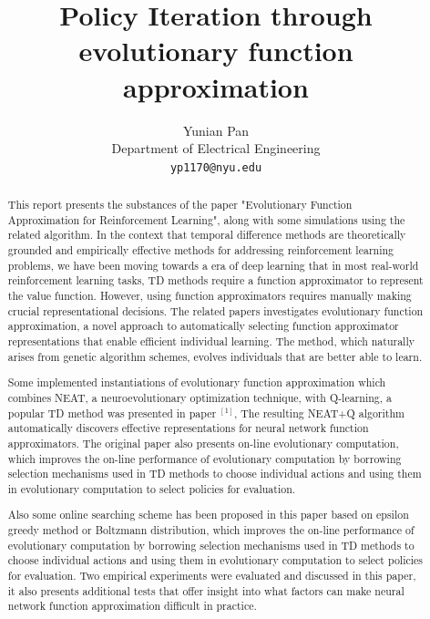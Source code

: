 \documentclass{article}
\title{Policy Iteration through evolutionary function approximation}
\author{%
  Yunian Pan \\
  Department of Electrical Engineering \\ 
  \texttt{yp1170@nyu.edu} 
}
\begin{document}
\maketitle

\begin{abstract}
  This report presents the substances of the paper "Evolutionary Function Approximation for Reinforcement Learning", along with some
  simulations using the related algorithm. In the context that temporal difference methods are theoretically grounded and empirically effective methods for addressing reinforcement learning problems,
 we have been moving towards a era of deep learning that in most real-world reinforcement learning tasks, 
TD methods require a function approximator to represent the value function. However, using function approximators
 requires manually making crucial representational decisions. The related papers investigates evolutionary function approximation, 
 a novel approach to automatically selecting function approximator representations that enable efficient individual learning. 
 The method, which naturally arises from genetic algorithm schemes, evolves individuals that are better able to learn. 
 
 Some implemented instantiations of evolutionary function approximation which combines NEAT, a neuroevolutionary optimization technique,
  with Q-learning, a popular TD method was presented in paper $^{[1]}$, The resulting NEAT+Q algorithm automatically discovers effective
  representations for neural network function approximators. The original paper also presents on-line evolutionary computation, which improves
   the on-line performance of evolutionary computation by borrowing selection mechanisms used in TD methods to choose individual actions
    and using them in evolutionary computation to select policies for evaluation. 

  Also some online searching scheme has been proposed in this paper based on epsilon greedy method or Boltzmann distribution, which improves 
  the on-line performance of evolutionary computation by borrowing selection mechanisms used in TD methods to choose individual actions 
  and using them in evolutionary computation to select policies for evaluation. Two empirical experiments were evaluated and discussed
  in this paper, it also presents additional tests that offer insight into what factors can make neural network function approximation difficult in practice.


\end{abstract}
\end{document}
